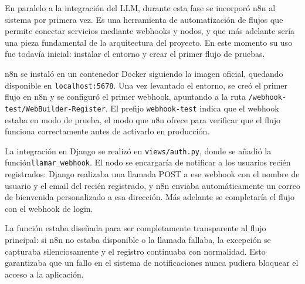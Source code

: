 En paralelo a la integración del LLM, durante esta fase se incorporó n8n al sistema por primera vez. Es una herramienta de automatización de flujos que permite conectar servicios mediante webhooks y nodos, y que más adelante sería una pieza fundamental de la arquitectura del proyecto. En este momento su uso fue todavía inicial: instalar el entorno y crear el primer flujo de pruebas.

n8n se instaló en un contenedor Docker siguiendo la imagen oficial, quedando disponible en \texttt{localhost:5678}. Una vez levantado el entorno, se creó el primer flujo en n8n y se configuró el primer webhook, apuntando a la ruta \texttt{/webhook-test/WebBuilder-Register}. El prefijo \texttt{webhook-test} indica que el webhook estaba en modo de prueba, el modo que n8n ofrece para verificar que el flujo funciona correctamente antes de activarlo en producción.

La integración en Django se realizó en \texttt{views/auth.py}, donde se añadió la función\texttt{llamar\_webhook}. El nodo se encargaría de notificar a los usuarios recién registrados: Django realizaba una llamada POST a ese webhook con el nombre de usuario y el email del recién registrado, y n8n enviaba automáticamente un correo de bienvenida 
personalizado a esa dirección. Más adelante se completaría el flujo con el webhook de login.

La función estaba diseñada para ser completamente transparente al flujo principal: si n8n no estaba disponible o la llamada fallaba, la excepción se capturaba silenciosamente y el registro continuaba con normalidad. Esto garantizaba que un fallo en el sistema de notificaciones nunca pudiera bloquear el acceso a la aplicación.


